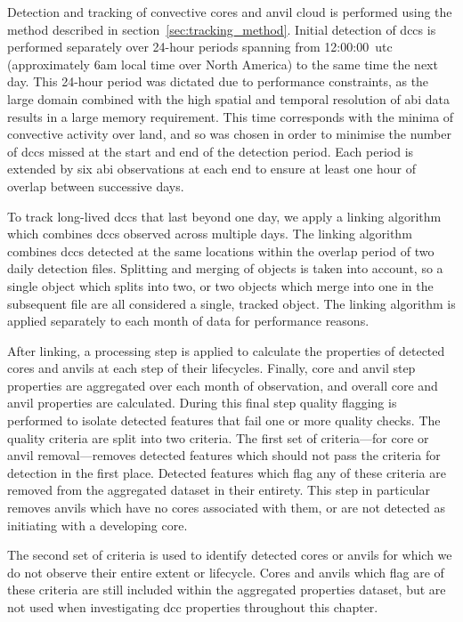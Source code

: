 Detection and tracking of convective cores and anvil cloud is performed using the method described in section~\ref{sec:tracking_method}.
Initial detection of \acrshort{dcc}s is performed separately over 24-hour periods spanning from 12:00:00~\acrshort{utc} (approximately 6am local time over North America) to the same time the next day.
This 24-hour period was dictated due to performance constraints, as the large domain combined with the high spatial and temporal resolution of \acrshort{abi} data results in a large memory requirement.
This time corresponds with the minima of convective activity over land, and so was chosen in order to minimise the number of \acrshort{dcc}s missed at the start and end of the detection period.
Each period is extended by six \acrshort{abi} observations at each end to ensure at least one hour of overlap between successive days.

To track long-lived \acrshort{dcc}s that last beyond one day, we apply a linking algorithm which combines \acrshort{dcc}s observed across multiple days.
The linking algorithm combines \acrshort{dcc}s detected at the same locations within the overlap period of two daily detection files.
Splitting and merging of objects is taken into account, so a single object which splits into two, or two objects which merge into one in the subsequent file are all considered a single, tracked object.
The linking algorithm is applied separately to each month of data for performance reasons.

After linking, a processing step is applied to calculate the properties of detected cores and anvils at each step of their lifecycles.
Finally, core and anvil step properties are aggregated over each month of observation, and overall core and anvil properties are calculated.
During this final step quality flagging is performed to isolate detected features that fail one or more quality checks.
The quality criteria are split into two criteria.
The first set of criteria---for core or anvil removal---removes detected features which should not pass the criteria for detection in the first place.
Detected features which flag any of these criteria are removed from the aggregated dataset in their entirety.
This step in particular removes anvils which have no cores associated with them, or are not detected as initiating with a developing core.

The second set of criteria is used to identify detected cores or anvils for which we do not observe their entire extent or lifecycle.
Cores and anvils which flag are of these criteria are still included within the aggregated properties dataset, but are not used when investigating \acrshort{dcc} properties throughout this chapter.

